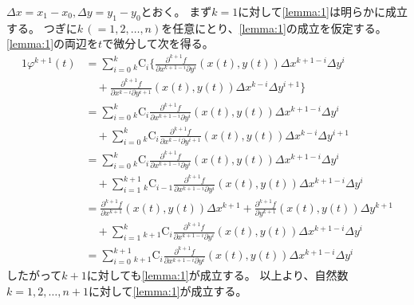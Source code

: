 \documentclass{article}
\makeatletter
\renewenvironment{proof}[1][\proofname]{\par
        \pushQED{\qed}
        \normalfont
        \topsep6\p@\@plus6\p@ \trivlist
        \item[\hskip\labelsep{\bfseries #1}\@addpunct{\bfseries}]\ignorespaces
    }{%
        \popQED\endtrivlist\@endpefalse
    }
\renewcommand{\proofname}{\underline{証明.}}
\newcommand{\combination}[2]{{}_{#1} \mathrm{C}_{#2}}
\makeatother
\begin{document}
\begin{proof}
    $\Delta x = x_1 - x_0, \Delta y = y_1 - y_0$とおく。
    まず$k=1$に対して\cref{lemma:1}は明らかに成立する。
    つぎに$k\,(=1,2,\dots,n)$を任意にとり、\cref{lemma:1}の成立を仮定する。
    \cref{lemma:1}の両辺を$t$で微分して次を得る。
    \begin{alignat}{1}
        \varphi^{k+1}(t) &= 
            \sum_{i=0}^{k}
                \combination{k}{i}
                \bigg\{
                \frac{\partial^{k+1} f}{\partial x^{k+1-i} \partial y^{i}} (x(t), y(t))
                \Delta x^{k+1-i}
                \Delta y^{i} \nonumber \\
        &\quad +
                \frac{\partial^{k+1} f}{\partial x^{k-i} \partial y^{i+1}} (x(t), y(t))
                \Delta x^{k-i}
                \Delta y^{i+1}
                \bigg\} \\
        &= 
            \sum_{i=0}^{k}
                \combination{k}{i}
                \frac{\partial^{k+1} f}{\partial x^{k+1-i} \partial y^{i}} (x(t), y(t))
                \Delta x^{k+1-i}
                \Delta y^{i} \nonumber \\
        &\quad +
            \sum_{i=0}^{k}
                \combination{k}{i}
                \frac{\partial^{k+1} f}{\partial x^{k-i} \partial y^{i+1}} (x(t), y(t))
                \Delta x^{k-i}
                \Delta y^{i+1} \\
        &= 
            \sum_{i=0}^{k}
                \combination{k}{i}
                \frac{\partial^{k+1} f}{\partial x^{k+1-i} \partial y^{i}} (x(t), y(t))
                \Delta x^{k+1-i}
                \Delta y^{i} \nonumber \\
        &\quad +
            \sum_{i=1}^{k+1}
                \combination{k}{i-1}
                \frac{\partial^{k+1} f}{\partial x^{k+1-i} \partial y^{i}} (x(t), y(t))
                \Delta x^{k+1-i}
                \Delta y^{i} \\
        &= 
            \frac{\partial^{k+1} f}{\partial x^{k+1}} (x(t), y(t))
            \Delta x^{k+1}
            +
            \frac{\partial^{k+1} f}{\partial y^{k+1}} (x(t), y(t))
            \Delta y^{k+1} \nonumber \\
        &\quad +
            \sum_{i=1}^{k}
                \combination{k+1}{i}
                \frac{\partial^{k+1} f}{\partial x^{k+1-i} \partial y^{i}} (x(t), y(t))
                \Delta x^{k+1-i}
                \Delta y^{i} \\
        &=
            \sum_{i=0}^{k+1}
                \combination{k+1}{i}
                \frac{\partial^{k+1} f}{\partial x^{k+1-i} \partial y^{i}} (x(t), y(t))
                \Delta x^{k+1-i}
                \Delta y^{i}
    \end{alignat}
    したがって$k+1$に対しても\cref{lemma:1}が成立する。
    以上より、自然数$k=1,2,\dots,n+1$に対して\cref{lemma:1}が成立する。
\end{proof}
\end{document}
